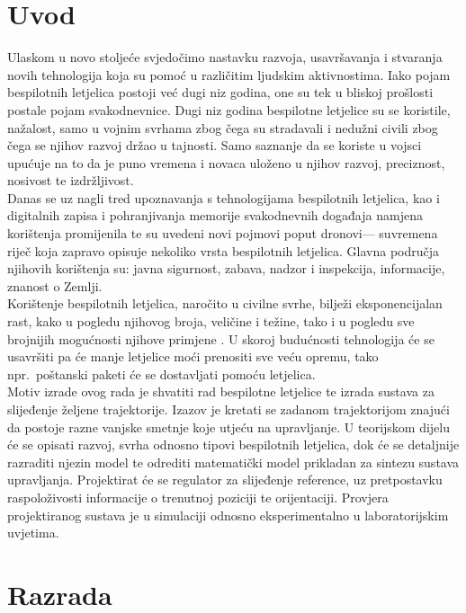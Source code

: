 \documentclass[times, utf8, diplomski]{fer}
\begin{document}
\chapter{Uvod}
Ulaskom u novo stoljeće svjedočimo nastavku razvoja, usavršavanja i stvaranja novih tehnologija koja su pomoć u različitim ljudskim aktivnostima. Iako pojam bespilotnih letjelica postoji već dugi niz godina, one su tek u bliskoj prošlosti postale pojam svakodnevnice. Dugi niz godina bespilotne letjelice su se koristile, nažalost, samo u vojnim svrhama zbog čega su stradavali i nedužni civili zbog čega se njihov razvoj držao u tajnosti. Samo saznanje da se koriste u vojsci upućuje na to da je puno vremena i novaca uloženo u njihov razvoj, preciznost, nosivost te izdržljivost.\\
Danas se uz nagli tred upoznavanja s tehnologijama bespilotnih letjelica, kao i digitalnih zapisa i pohranjivanja memorije svakodnevnih događaja namjena korištenja promijenila te su uvedeni novi pojmovi poput \glqq dronovi\grqq --- suvremena riječ koja zapravo opisuje nekoliko vrsta bespilotnih letjelica. Glavna područja njihovih korištenja su: javna sigurnost, zabava, nadzor i inspekcija, informacije, znanost o Zemlji.\\
Korištenje  bespilotnih letjelica, naročito u civilne svrhe, bilježi eksponencijalan rast, kako u pogledu njihovog broja, veličine i težine, tako i u pogledu sve brojnijih mogućnosti njihove primjene \citep{EUR-Lex}. U skoroj budućnosti tehnologija će se usavršiti pa će manje letjelice moći prenositi sve veću opremu, tako npr.~poštanski paketi će se dostavljati pomoću letjelica.\\
Motiv izrade ovog rada je shvatiti rad bespilotne letjelice te izrada sustava za slijeđenje željene trajektorije. Izazov je kretati se zadanom trajektorijom znajući da postoje razne vanjske smetnje koje utjeću na upravljanje. U teorijskom dijelu će se opisati razvoj, svrha odnosno tipovi bespilotnih letjelica, dok će se detaljnije razraditi njezin model te odrediti matematički model prikladan za sintezu sustava upravljanja. Projektirat će se regulator za slijeđenje reference, uz pretpostavku raspoloživosti informacije o trenutnoj poziciji te orijentaciji. Provjera projektiranog sustava je u simulaciji odnosno eksperimentalno u laboratorijskim uvjetima.

\chapter{Razrada}
\end{document}

